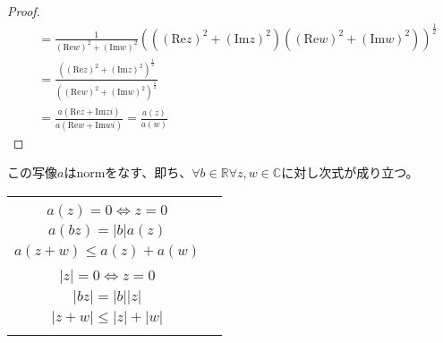 \documentclass[dvipdfmx]{jsarticle}
\begin{document}
\begin{proof}
\begin{align*}
&= \frac{1}{\left( \mathrm{Re}w \right)^{2} + \left( \mathrm{Im}w \right)^{2}}\left( \left( \left( \mathrm{Re}z \right)^{2} + \left( \mathrm{Im}z \right)^{2} \right)\left( \left( \mathrm{Re}w \right)^{2} + \left( \mathrm{Im}w \right)^{2} \right) \right)^{\frac{1}{2}}\\
&= \frac{\left( \left( \mathrm{Re}z \right)^{2} + \left( \mathrm{Im}z \right)^{2} \right)^{\frac{1}{2}}}{\left( \left( \mathrm{Re}w \right)^{2} + \left( \mathrm{Im}w \right)^{2} \right)^{\frac{1}{2}}}\\
&= \frac{a\left( \mathrm{Re}z + \mathrm{Im}zi \right)}{a\left( \mathrm{Re}w + \mathrm{Im}wi \right)} = \frac{a(z)}{a(w)}
\end{align*}
\end{proof}
\begin{thm}\label{4.1.2.13}
この写像$a$はnormをなす、即ち、$\forall b \in \mathbb{R}\forall z,w \in \mathbb{C}$に対し次式が成り立つ。
\begin{longtable}[c]{cc}
\begin{tabular}{c}
$0 \leq a(z)$\\
$a(z) = 0 \Leftrightarrow z = 0$\\
$a(bz) = |b|a(z)$\\
$a(z + w) \leq a(z) + a(w)$\\
\end{tabular} & \begin{tabular}{c}
$0 \leq |z|$\\
$|z| = 0 \Leftrightarrow z = 0$\\
$|bz| = |b||z|$\\
$|z + w| \leq |z| + |w|$\\
\end{tabular} \\
\end{longtable}
\end{thm}
\end{document}
